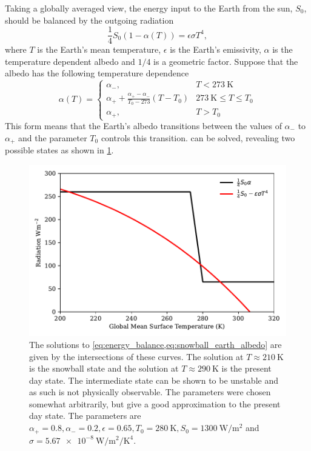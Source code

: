Taking a globally averaged view, the energy input to the Earth from the sun, $S_0$, should be balanced by the outgoing radiation \parencite{North1981,Andrews2010}
\begin{equation}
  \label{eq:energy_balance}
  \frac{1}{4}S_0 \left(1 - \alpha\left(T\right)\right) = \epsilon \sigma T^4,
\end{equation}
where $T$ is the Earth's mean temperature, $\epsilon$ is the Earth's emissivity, $\alpha$ is the temperature dependent albedo and $1/4$ is a geometric factor. Suppose that the albedo has the following
temperature dependence
\begin{equation}
  \label{eq:snowball_earth_albedo}
  \alpha(T) =
  \begin{cases}
    \alpha_- ,                                                         & T < \SI{273}{\kelvin} \\
    \alpha_+ + \frac{\alpha_+ - \alpha_-}{T_0 - 273} \left(T-T_0\right) & \SI{273}{\kelvin} \leq T \leq T_0 \\
    \alpha_+ ,                                                         & T > T_0
  \end{cases}
\end{equation}
This form means that the Earth's albedo transitions between the values of $\alpha_-$ to $\alpha_+$ and the parameter $T_0$ controls this transition.  can be solved,
revealing two possible states as shown in \cref{fig:energy_balance_solution}.
\begin{figure}
  \centering
  \includegraphics[width=\textwidth,keepaspectratio]{snowball}
  \caption{The solutions to \cref{eq:energy_balance,eq:snowball_earth_albedo} are given by the intersections of these curves. The solution at $T\approx\SI{210}{\kelvin}$ is the snowball
    state and the solution at $T\approx \SI{290}{\kelvin}$ is the present day state. The intermediate state can be shown to be unstable and as such is not physically observable. The parameters were
    chosen somewhat arbitrarily,  but give a good approximation to the present day state. The parameters are $\alpha_+ = 0.8,\alpha_-=0.2,\epsilon=0.65,T_0 = \SI{280}{\kelvin},S_0 = \SI{1300}{\watt\per\meter\squared}$
    and $\sigma = \SI{5.67e-8}{\watt\per\meter\squared\per\kelvin\tothe{4}}$.}
  \label{fig:energy_balance_solution}
\end{figure}

